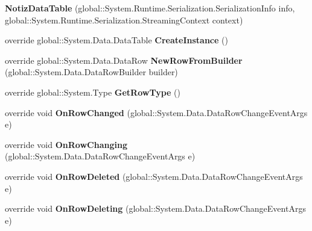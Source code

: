 \begin{DoxyCompactItemize}
\item 
{\bfseries Notiz\+Data\+Table} (global\+::\+System.\+Runtime.\+Serialization.\+Serialization\+Info info, global\+::\+System.\+Runtime.\+Serialization.\+Streaming\+Context context)\hypertarget{class_products_1_1_data_1_1ds_sage_1_1_notiz_data_table_ae35ce277bbc83c458c54a29c9b47784e}{}\label{class_products_1_1_data_1_1ds_sage_1_1_notiz_data_table_ae35ce277bbc83c458c54a29c9b47784e}

\item 
override global\+::\+System.\+Data.\+Data\+Table {\bfseries Create\+Instance} ()\hypertarget{class_products_1_1_data_1_1ds_sage_1_1_notiz_data_table_a45d01ffb1495de9c8e4cf81021c45744}{}\label{class_products_1_1_data_1_1ds_sage_1_1_notiz_data_table_a45d01ffb1495de9c8e4cf81021c45744}

\item 
override global\+::\+System.\+Data.\+Data\+Row {\bfseries New\+Row\+From\+Builder} (global\+::\+System.\+Data.\+Data\+Row\+Builder builder)\hypertarget{class_products_1_1_data_1_1ds_sage_1_1_notiz_data_table_a08583c8cc8d649296a7803bec239e3ad}{}\label{class_products_1_1_data_1_1ds_sage_1_1_notiz_data_table_a08583c8cc8d649296a7803bec239e3ad}

\item 
override global\+::\+System.\+Type {\bfseries Get\+Row\+Type} ()\hypertarget{class_products_1_1_data_1_1ds_sage_1_1_notiz_data_table_a24112820b99a2825df960bf8f749f109}{}\label{class_products_1_1_data_1_1ds_sage_1_1_notiz_data_table_a24112820b99a2825df960bf8f749f109}

\item 
override void {\bfseries On\+Row\+Changed} (global\+::\+System.\+Data.\+Data\+Row\+Change\+Event\+Args e)\hypertarget{class_products_1_1_data_1_1ds_sage_1_1_notiz_data_table_ac9d97790b25f0bd7739e71477fc7058c}{}\label{class_products_1_1_data_1_1ds_sage_1_1_notiz_data_table_ac9d97790b25f0bd7739e71477fc7058c}

\item 
override void {\bfseries On\+Row\+Changing} (global\+::\+System.\+Data.\+Data\+Row\+Change\+Event\+Args e)\hypertarget{class_products_1_1_data_1_1ds_sage_1_1_notiz_data_table_a89348b9a32b0983784e1c7cd35ff3176}{}\label{class_products_1_1_data_1_1ds_sage_1_1_notiz_data_table_a89348b9a32b0983784e1c7cd35ff3176}

\item 
override void {\bfseries On\+Row\+Deleted} (global\+::\+System.\+Data.\+Data\+Row\+Change\+Event\+Args e)\hypertarget{class_products_1_1_data_1_1ds_sage_1_1_notiz_data_table_a38180993e9515e89706cb562fceaa16f}{}\label{class_products_1_1_data_1_1ds_sage_1_1_notiz_data_table_a38180993e9515e89706cb562fceaa16f}

\item 
override void {\bfseries On\+Row\+Deleting} (global\+::\+System.\+Data.\+Data\+Row\+Change\+Event\+Args e)\hypertarget{class_products_1_1_data_1_1ds_sage_1_1_notiz_data_table_a0440d773dfe60b0fee45b6ae0a13afd6}{}\label{class_products_1_1_data_1_1ds_sage_1_1_notiz_data_table_a0440d773dfe60b0fee45b6ae0a13afd6}

\end{DoxyCompactItemize}
